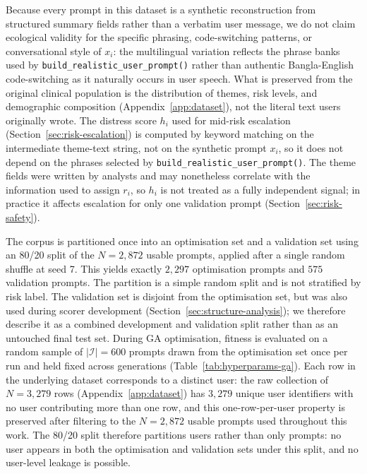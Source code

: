 \documentclass[mathematics,article,submit,xetex,moreauthors]{Definitions/mdpi}
\begin{document}
Because every prompt in this dataset is a synthetic reconstruction from
structured summary fields rather than a verbatim user message, we do not
claim ecological validity for the specific phrasing, code-switching
patterns, or conversational style of $x_i$: the multilingual variation
reflects the phrase banks used by \texttt{build\_realistic\_user\_prompt()}
rather than authentic Bangla-English code-switching as it naturally occurs
in user speech. What is preserved from the original clinical population is
the distribution of themes, risk levels, and demographic composition
(Appendix~\ref{app:dataset}), not the literal text users originally wrote.
The distress score $h_i$ used for mid-risk escalation
(Section~\ref{sec:risk-escalation}) is computed by keyword matching on the
intermediate theme-text string, not on the synthetic prompt $x_i$, so it
does not depend on the phrases selected by
\texttt{build\_realistic\_user\_prompt()}. The theme fields were written by
analysts and may nonetheless correlate with the information used to assign
$r_i$, so $h_i$ is not treated as a fully independent signal; in practice it
affects escalation for only one validation prompt
(Section~\ref{sec:risk-safety}).

The corpus is partitioned once into an optimisation set and a validation set
using an 80/20 split of the $N = 2{,}872$ usable prompts, applied after a
single random shuffle at seed 7. This yields exactly $2{,}297$ optimisation
prompts and $575$ validation prompts. The partition is a simple random split
and is not stratified by risk label. The validation set is disjoint from the
optimisation set, but was also used during scorer development
(Section~\ref{sec:structure-analysis}); we therefore describe it as a combined
development and validation split rather than as an untouched final test set.
During GA optimisation, fitness is evaluated on a random sample of
$|\mathcal{I}| = 600$ prompts drawn from the optimisation set once per run and
held fixed across generations (Table~\ref{tab:hyperparams-ga}).
Each row in the underlying dataset
corresponds to a distinct user: the raw collection of $N=3{,}279$ rows
(Appendix~\ref{app:dataset}) has $3{,}279$ unique user identifiers with no
user contributing more than one row, and this one-row-per-user property is
preserved after filtering to the $N=2{,}872$ usable prompts used throughout
this work. The 80/20 split therefore partitions users rather than only
prompts: no user appears in both the optimisation and validation sets under
this split, and no user-level leakage is possible.
\end{document}
